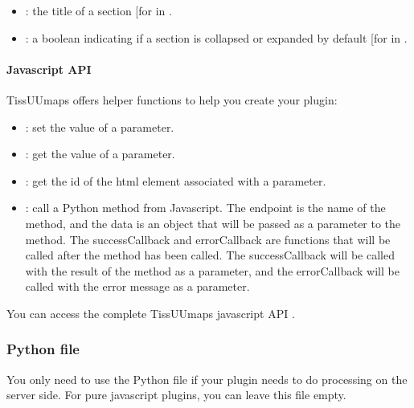\documentclass[letterpaper,10pt,english,openany,oneside]{sphinxmanual}
\begin{document}
\begin{itemize}
\item {} 
\sphinxAtStartPar
{}: the title of a section {[}for  in \sphinxcode{\sphinxupquote{section}}{]}.

\item {} 
\sphinxAtStartPar
{}: a boolean indicating if a section is collapsed or expanded by default {[}for  in \sphinxcode{\sphinxupquote{section}}{]}.

\end{itemize}


\paragraph{Javascript API}
\label{\detokenize{docs/starting/plugins:javascript-api}}
\sphinxAtStartPar
TissUUmaps offers helper functions to help you create your plugin:
\begin{itemize}
\item {} 
\sphinxAtStartPar
{}: set the value of a parameter.

\item {} 
\sphinxAtStartPar
{}: get the value of a parameter.

\item {} 
\sphinxAtStartPar
{}: get the id of the html element associated with a parameter.

\item {} 
\sphinxAtStartPar
{}: call a Python method from Javascript. The endpoint is the name of the method, and the data is an object that will be passed as a parameter to the method. The successCallback and errorCallback are functions that will be called after the method has been called. The successCallback will be called with the result of the method as a parameter, and the errorCallback will be called with the error message as a parameter.

\end{itemize}

\sphinxAtStartPar
You can access the complete TissUUmaps javascript API .


\subsubsection{Python file}
\label{\detokenize{docs/starting/plugins:python-file}}
\sphinxAtStartPar
You only need to use the Python file if your plugin needs to do processing on the server side. For pure javascript plugins, you can leave this file empty.
\end{document}
